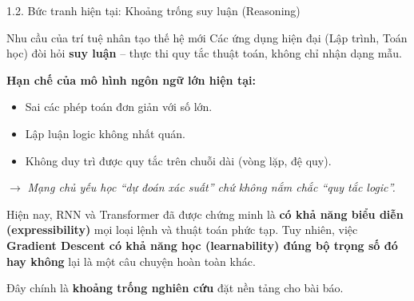 \documentclass[10pt, aspectratio=169]{beamer}
\begin{document}
\begin{frame}{1.2. Bức tranh hiện tại: Khoảng trống suy luận (Reasoning)}

    \begin{block}{Nhu cầu của trí tuệ nhân tạo thế hệ mới}
        Các ứng dụng hiện đại (Lập trình, Toán học) đòi hỏi \textbf{suy luận} – 
        thực thi quy tắc thuật toán, không chỉ nhận dạng mẫu.
    \end{block}
    
    \textbf{Hạn chế của mô hình ngôn ngữ lớn hiện tại:}
    \begin{itemize}
        \item Sai các phép toán đơn giản với số lớn.
        \item Lập luận logic không nhất quán.
        \item Không duy trì được quy tắc trên chuỗi dài (vòng lặp, đệ quy).
    \end{itemize}
    $\to$ \textit{Mạng chủ yếu học “dự đoán xác suất” chứ không nắm chắc “quy tắc logic”.}

    \vspace{0.8em}

    Hiện nay, RNN và Transformer đã được chứng minh là \textbf{có khả năng biểu diễn
    (expressibility)} mọi loại lệnh và thuật toán phức tạp.  
    Tuy nhiên, việc \textbf{Gradient Descent có khả năng học (learnability) đúng bộ trọng số đó hay không}
    lại là một câu chuyện hoàn toàn khác.  

    \vspace{0.3em}

    Đây chính là \textbf{khoảng trống nghiên cứu} đặt nền tảng cho bài báo.
    
\end{frame}


        
\end{document}
